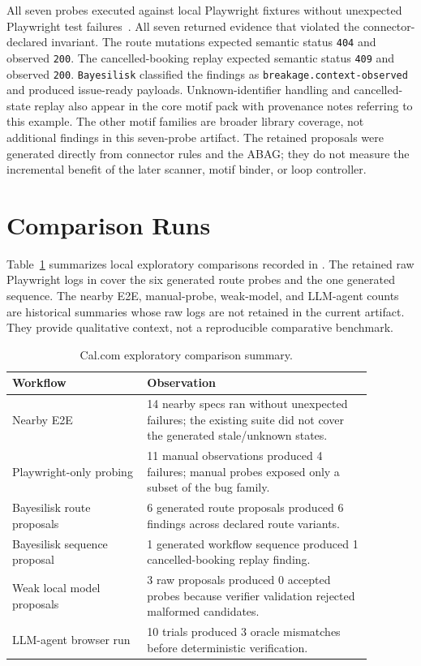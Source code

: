 \documentclass[10pt]{article}
\newcommand{\tool}{\texttt{Bayesilisk}\xspace}
\begin{document}
All seven probes executed against local Playwright fixtures without unexpected
Playwright test failures~\cite{playwright}. All seven returned evidence that violated the
connector-declared invariant. The route mutations expected semantic status
\texttt{404} and observed \texttt{200}. The cancelled-booking replay expected
semantic status \texttt{409} and observed \texttt{200}. \tool classified the
findings as \texttt{breakage.context-observed} and produced issue-ready
payloads. Unknown-identifier handling and cancelled-state replay also appear in
the core motif pack with provenance notes referring to this example. The other
motif families are broader library coverage, not additional findings in this
seven-probe artifact. The retained proposals were generated directly from
connector rules and the ABAG; they do not measure the incremental benefit of
the later scanner, motif binder, or loop controller.

\section{Comparison Runs}

Table~\ref{tab:calcom-comparisons} summarizes local exploratory comparisons
recorded in . The retained raw Playwright logs in
 cover the six generated route probes and the
one generated sequence. The nearby E2E, manual-probe, weak-model, and LLM-agent
counts are historical summaries whose raw logs are not retained in the current
artifact. They provide qualitative context, not a reproducible comparative
benchmark.

\begin{table}[H]
\centering
\caption{Cal.com exploratory comparison summary.}
\label{tab:calcom-comparisons}
\small
\setlength{\tabcolsep}{3pt}
\begin{tabular}{p{0.33\linewidth}p{0.55\linewidth}}
\toprule
Workflow & Observation \\
\midrule
Nearby E2E & 14 nearby specs ran without unexpected failures; the existing suite did not cover the generated stale/unknown states. \\
Playwright-only probing & 11 manual observations produced 4 failures; manual probes exposed only a subset of the bug family. \\
Bayesilisk route proposals & 6 generated route proposals produced 6 findings across declared route variants. \\
Bayesilisk sequence proposal & 1 generated workflow sequence produced 1 cancelled-booking replay finding. \\
Weak local model proposals & 3 raw proposals produced 0 accepted probes because verifier validation rejected malformed candidates. \\
LLM-agent browser run & 10 trials produced 3 oracle mismatches before deterministic verification. \\
\bottomrule
\end{tabular}
\end{table}
\end{document}

